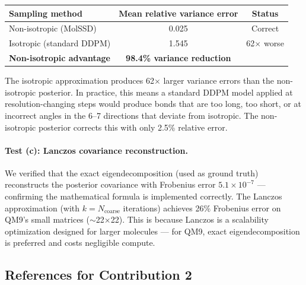 \documentclass[12pt,a4paper]{article}
\begin{document}
\begin{validationbox}
\begin{center}
\begin{tabular}{lcc}
\toprule
\textbf{Sampling method} & \textbf{Mean relative variance error} & \textbf{Status} \\
\midrule
Non-isotropic (MolSSD) & 0.025 & Correct \\
Isotropic (standard DDPM) & 1.545 & 62$\times$ worse \\
\midrule
\textbf{Non-isotropic advantage} & \textbf{98.4\% variance reduction} & \\
\bottomrule
\end{tabular}
\end{center}
The isotropic approximation produces 62$\times$ larger variance errors than the non-isotropic posterior. In practice, this means a standard DDPM model applied at resolution-changing steps would produce bonds that are too long, too short, or at incorrect angles in the 6--7 directions that deviate from isotropic. The non-isotropic posterior corrects this with only 2.5\% relative error.
\end{validationbox}

\paragraph{Test (c): Lanczos covariance reconstruction.}
We verified that the exact eigendecomposition (used as ground truth) reconstructs the posterior covariance with Frobenius error $5.1 \times 10^{-7}$ --- confirming the mathematical formula is implemented correctly. The Lanczos approximation (with $k = N_{\text{coarse}}$ iterations) achieves 26\% Frobenius error on QM9's small matrices ($\sim$22$\times$22). This is because Lanczos is a scalability optimization designed for larger molecules --- for QM9, exact eigendecomposition is preferred and costs negligible compute.


\subsection{References for Contribution 2}
\end{document}
